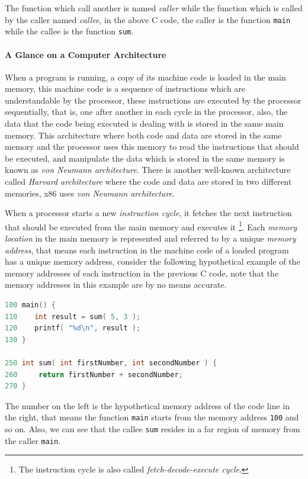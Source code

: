 The function which call another is named \emph{caller} while the
function which is called by the caller named \emph{callee}, in the above
C code, the caller is the function \lstinline!main! while the callee is
the function \lstinline!sum!.

\paragraph{A Glance on a Computer
Architecture}\label{a-glance-on-a-computer-architecture}

When a program is running, a copy of its machine code is loaded in the
main memory, this machine code is a sequence of instructions which are
understandable by the processor, these instructions are executed by the
processor sequentially, that is, one after another in each cycle in the
processor, also, the data that the code being executed is dealing with
is stored in the same main memory. This architecture where both code and
data are stored in the same memory and the processor uses this memory to
read the instructions that should be executed, and manipulate the data
which is stored in the same memory is known as \emph{von Neumann
architecture}. There is another well-known architecture called
\emph{Harvard architecture} where the code and data are stored in two
different memories, x86 uses \emph{von Neumann architecture}.

When a processor starts a new \emph{instruction cycle}, it fetches the
next instruction that should be executed from the main memory and
executes it \footnote{The instruction cycle is also called
  \emph{fetch-decode-execute cycle}.}. Each \emph{memory location} in
the main memory is represented and referred to by a unique \emph{memory
address}, that means each instruction in the machine code of a loaded
program has a unique memory address, consider the following hypothetical
example of the memory addresses of each instruction in the previous C
code, note that the memory addresses in this example are by no means
accurate.

\begin{lstlisting}[language=C]
100 main() {
110    int result = sum( 5, 3 );
120    printf( "%d\n", result );
130 }

250 int sum( int firstNumber, int secondNumber ) {
260     return firstNumber + secondNumber;
270 }
\end{lstlisting}

The number on the left is the hypothetical memory address of the code
line in the right, that means the function \lstinline!main! starts from
the memory address \lstinline!100! and so on. Also, we can see that the
callee \lstinline!sum! resides in a far region of memory from the caller
\lstinline!main!.

